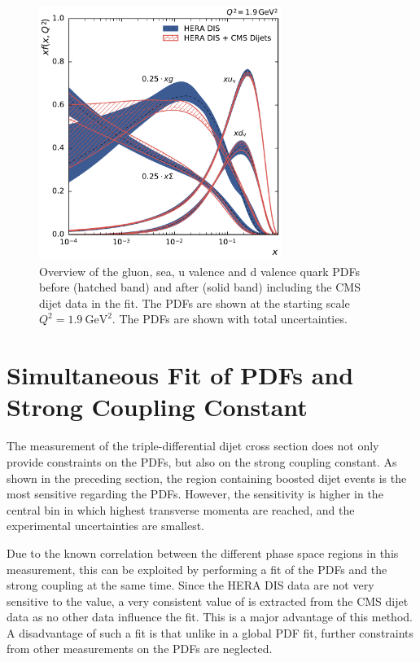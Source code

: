 \begin{figure}[tbp]
  \centering
  \includegraphics[width=0.7\textwidth]{figures/pdf_constraints/pdfcomp_direct_overview_1.9.pdf}\hfill%
  \caption[Overview of gluon and quark PDFs]{Overview of the gluon, sea, u
  valence and d valence quark PDFs before (hatched band) and after (solid band)
  including the CMS dijet data in the fit. The PDFs are shown at the starting
  scale $Q^2 = \SI{1.9}{\GeV \squared}$. The PDFs are shown with total
  uncertainties.}
  \label{fig:pdfconstraints:overview:19}
\end{figure}

\section{Simultaneous Fit of PDFs and Strong Coupling Constant}

The measurement of the triple-differential dijet cross section does not only
provide constraints on the PDFs, but also on the strong coupling constant. As
shown in the preceding section, the region containing boosted dijet events is
the most sensitive regarding the PDFs. However, the \as sensitivity is higher in
the central bin in which highest transverse momenta are reached, and the
experimental uncertainties are smallest.

Due to the known correlation between the different phase space regions in this
measurement, this can be exploited by performing a fit of the PDFs and the
strong coupling at the same time. Since the HERA DIS data are not very sensitive
to the \asmz value, a very consistent value of \asmz is extracted from the CMS
dijet data as no other data influence the fit. This is a major advantage of this
method. A disadvantage of such a fit is that unlike in a global PDF fit, further
constraints from other measurements on the PDFs are neglected. 

